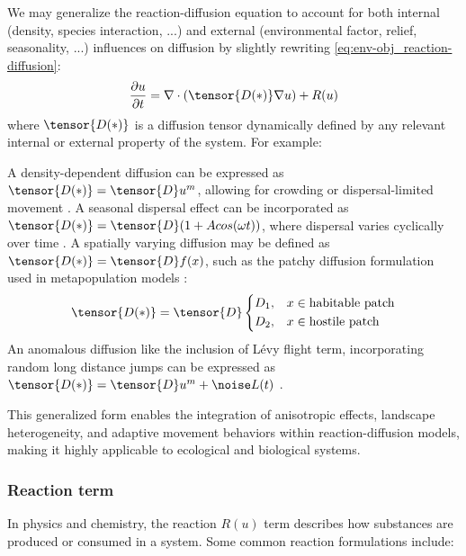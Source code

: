 We may generalize the reaction-diffusion equation to account for both internal (density, species interaction, ...) and external (environmental factor, relief, seasonality, ...) influences on diffusion by slightly rewriting \cref{eq:env-obj_reaction-diffusion}:
\begin{align}
    \frac{\partial u}{\partial t} = \nabla \cdot (\tensor{D(*)} \nabla u) + R(u)
\end{align}
where $\tensor{D(*)}$  is a diffusion tensor dynamically defined by any relevant internal or external property of the system. For example:
\begin{Itemize}
    \Item{} A density-dependent diffusion can be expressed as $\tensor{D(*)} = \tensor{D} u^m$, allowing for crowding or dispersal-limited movement \cite{Zhu2023}.
    \Item{} A seasonal dispersal effect can be incorporated as $\tensor{D(*)} = \tensor{D} (1 + A cos(\omega t) )$, where dispersal varies cyclically over time \cite{Katriel2021}.
    \Item{} A spatially varying diffusion may be defined as $\tensor{D(*)} = \tensor{D} f(x)$, such as the patchy diffusion formulation used in metapopulation models \cite{Czaran1998}:
    \begin{align}
        \tensor{D(*)} = \tensor{D} \begin{dcases}
            D_1, & x \in \text{habitable patch} \\
            D_2, & x \in \text{hostile patch}
        \end{dcases}
    \end{align}
    \Item{} An anomalous diffusion like the inclusion of Lévy flight term, incorporating random long distance jumps can be expressed as $\tensor{D(*)} = \tensor{D} u^m + \noise L(t)$ \cite{Humphries2014,Chechkin2008}.
\end{Itemize}

This generalized form enables the integration of anisotropic effects, landscape heterogeneity, and adaptive movement behaviors within reaction-diffusion models, making it highly applicable to ecological and biological systems.

\subsubsection{Reaction term}
In physics and chemistry, the reaction $R(u)$ term describes how substances are produced or consumed in a system. Some common reaction formulations include:

